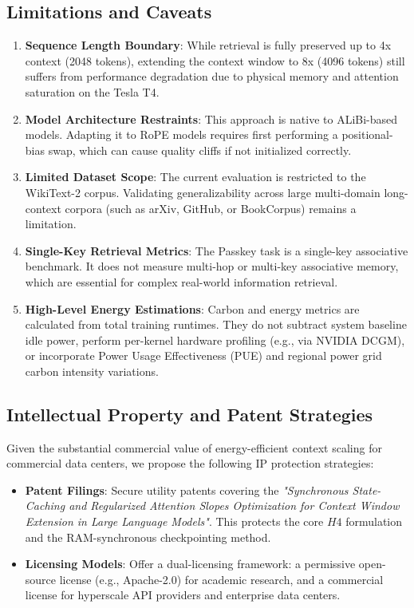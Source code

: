 \documentclass[11pt,journal,compsoc]{IEEEtran}
\begin{document}
\subsection{Limitations and Caveats}
\begin{enumerate}
    \item \textbf{Sequence Length Boundary}: While retrieval is fully preserved up to 4x context (2048 tokens), extending the context window to 8x (4096 tokens) still suffers from performance degradation due to physical memory and attention saturation on the Tesla T4.
    \item \textbf{Model Architecture Restraints}: This approach is native to ALiBi-based models. Adapting it to RoPE models requires first performing a positional-bias swap, which can cause quality cliffs if not initialized correctly.
    \item \textbf{Limited Dataset Scope}: The current evaluation is restricted to the WikiText-2 corpus. Validating generalizability across large multi-domain long-context corpora (such as arXiv, GitHub, or BookCorpus) remains a limitation.
    \item \textbf{Single-Key Retrieval Metrics}: The Passkey task is a single-key associative benchmark. It does not measure multi-hop or multi-key associative memory, which are essential for complex real-world information retrieval.
    \item \textbf{High-Level Energy Estimations}: Carbon and energy metrics are calculated from total training runtimes. They do not subtract system baseline idle power, perform per-kernel hardware profiling (e.g., via NVIDIA DCGM), or incorporate Power Usage Effectiveness (PUE) and regional power grid carbon intensity variations.
\end{enumerate}

\subsection{Intellectual Property and Patent Strategies}
Given the substantial commercial value of energy-efficient context scaling for commercial data centers, we propose the following IP protection strategies:
\begin{itemize}
    \item \textbf{Patent Filings}: Secure utility patents covering the \textit{"Synchronous State-Caching and Regularized Attention Slopes Optimization for Context Window Extension in Large Language Models"}. This protects the core $H4$ formulation and the RAM-synchronous checkpointing method.
    \item \textbf{Licensing Models}: Offer a dual-licensing framework: a permissive open-source license (e.g., Apache-2.0) for academic research, and a commercial license for hyperscale API providers and enterprise data centers.
\end{itemize}
\end{document}
